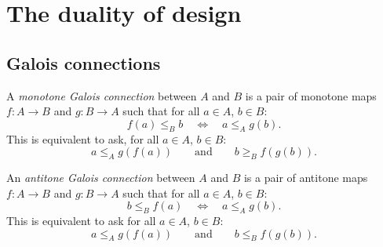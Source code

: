 \section{The duality of design}
\subsection{Galois connections}



\begin{definition}
A \emph{monotone Galois connection} between $A$ and $B$ is a pair of monotone maps $f\colon A\to B$ and $g\colon B\to A$ such that for all $a\in A$, $b\in B$:
\begin{equation}
    f(a) \leq_B b \quad \Leftrightarrow \quad a \leq_A g(b).
\end{equation}
This is equivalent to ask, for all $a\in A$, $b\in B$:
\begin{equation}
    a\leq_A g(f(a)) \qquad \text{and} \qquad b\geq_{B}f(g(b)).
\end{equation}
\end{definition}



\begin{definition}
An \emph{antitone Galois connection} between $A$ and $B$ is a pair of antitone maps $f\colon A\to B$ and $g \colon B\to A$ such that for all $a\in A$, $b\in B$:
\begin{equation}
    b \leq_B f(a) \quad \Leftrightarrow \quad a \leq_A g(b).
\end{equation}
This is equivalent to ask for all $a\in A$, $b\in B$:
\begin{equation}
a \leq_A g(f(a))   \qquad \text{and} \qquad  b \leq_B f(g(b)).
\end{equation}
\end{definition}

